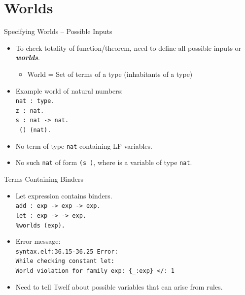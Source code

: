\documentclass{beamer}
\renewcommand{\emph}[1]{\textbf{\textit{#1}}}
\begin{document}
\section{Worlds}

\begin{frame}{Specifying Worlds -- Possible Inputs}
\begin{itemize}
\item To check totality of function/theorem,
need to define all possible inputs or \emph{worlds}.
  \begin{itemize}
  \item World = Set of terms of a type (inhabitants of a type)
  \end{itemize}

\item Example world of natural numbers: \\

\texttt{nat : type.} \\
\texttt{z : nat.} \\
\texttt{s : nat -> nat.} \\
\texttt{ () (nat).}

\pause
\item No term of type \texttt{nat} containing LF variables.
\item No such \texttt{nat} of form \texttt{(s )},
where \texttt{} is a variable of type \texttt{nat}.
\end{itemize}
\end{frame}

\begin{frame}{Terms Containing Binders}
\begin{itemize}
\item Let expression contains binders. \\

\texttt{add : exp -> exp -> exp.} \\
\texttt{let : exp ->  -> exp.} \\
\texttt{\%worlds \cemph{()} (exp).}

\pause
\item Error message: \\

\texttt{syntax.elf:36.15-36.25 Error:} \\
\texttt{While checking constant let:} \\
\texttt{World violation for family exp: \{\_:exp\} </: 1}

\pause
\item Need to tell Twelf about possible variables
that can arise from rules.
\end{itemize}
\end{frame}
\end{document}
